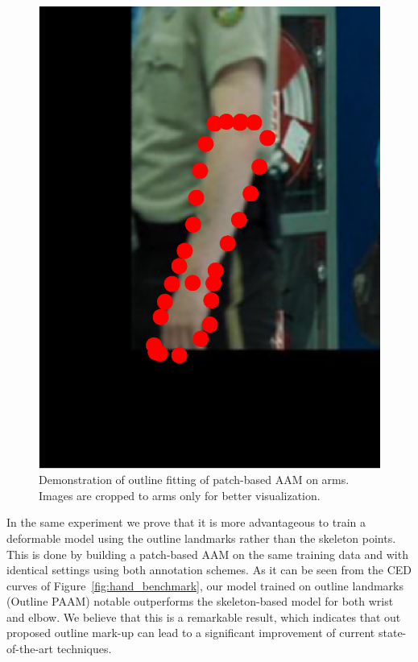 \begin{figure}
    \includegraphics[height=\ofh]{resources/Annotation_Correction/Suplementory_Meterial/ExFit/0044.eps}
    \caption{Demonstration of outline fitting of patch-based AAM on arms. Images are cropped to arms only for better visualization.}
    \label{fig:outline_fitting}
\end{figure}

In the same experiment we prove that it is more advantageous to train a deformable model using the outline landmarks rather than the skeleton points. This is done by building a patch-based AAM on the same training data and with identical settings using both annotation schemes. As it can be seen from the  CED curves of Figure~\ref{fig:hand_benchmark}, our model trained on outline landmarks (Outline PAAM) notable outperforms the skeleton-based model for both wrist and elbow. We believe that this is a remarkable result, which indicates that out proposed outline mark-up can lead to a significant improvement of current state-of-the-art techniques.

